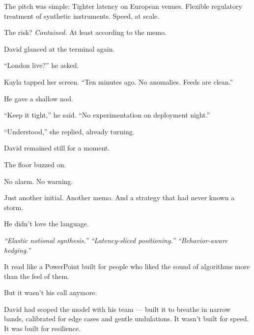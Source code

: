 \medskip




The pitch was simple:
Tighter latency on European venues.
Flexible regulatory treatment of synthetic instruments.
Speed, at scale.

The risk?
\textit{Contained.} At least according to the memo.

David glanced at the terminal again.

“London live?” he asked.

Kayla tapped her screen. “Ten minutes ago. No anomalies. Feeds are clean.”

He gave a shallow nod.

“Keep it tight,” he said. “No experimentation on deployment night.”

“Understood,” she replied, already turning.

David remained still for a moment.

The floor buzzed on.

No alarm.
No warning.

Just another initial.
Another memo.
And a strategy that had never known a storm.


He didn’t love the language.

\textit{“Elastic notional synthesis.” “Latency-sliced positioning.” “Behavior-aware hedging.”}

It read like a PowerPoint built for people who liked the sound of algorithms more than the feel of them.

But it wasn’t his call anymore.

David had scoped the model with his team — built it to breathe in narrow bands, calibrated for edge 
cases and gentle undulations.
It wasn’t built for speed.
It was built for resilience.

\medskip

\medskip

